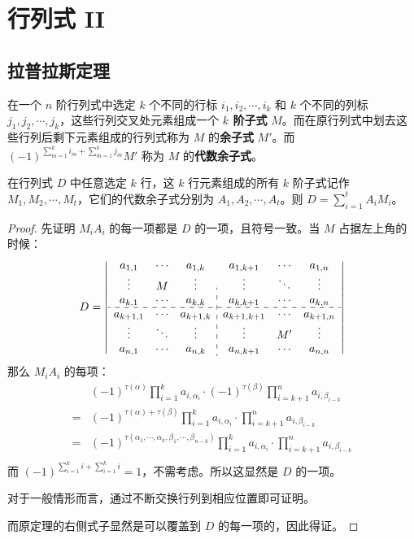 \section{行列式 II}

\subsection{拉普拉斯定理}

\begin{definition}
	在一个 $n$ 阶行列式中选定 $k$ 个不同的行标 $i_1,i_2,\cdots,i_k$ 和 $k$ 个不同的列标 $j_1,j_2,\cdots,j_k$，这些行列交叉处元素组成一个 \textbf{$k$ 阶子式} $M$。而在原行列式中划去这些行列后剩下元素组成的行列式称为 $M$ 的\textbf{余子式} $M'$。而 $(-1)^{\sum_{m=1}^k i_m + \sum_{m=1}^k j_m} M'$ 称为 $M$ 的\textbf{代数余子式}。
\end{definition}

\begin{theorem}[拉普拉斯定理]
	在行列式 $D$ 中任意选定 $k$ 行，这 $k$ 行元素组成的所有 $k$ 阶子式记作 $M_1,M_2,\cdots,M_t$，它们的代数余子式分别为 $A_1,A_2,\cdots,A_t$。则 $D = \sum_{i=1}^t A_i M_i$。

	\begin{proof}
		先证明 $M_i A_i$ 的每一项都是 $D$ 的一项，且符号一致。当 $M$ 占据左上角的时候：
		$$
		D = \left|\begin{array}{ccc:ccc}
			a_{1,1} & \cdots & a_{1,k} & a_{1,k+1} & \cdots & a_{1,n} \\
			\vdots & M & \vdots & \vdots & \ddots & \vdots \\
			a_{k,1} & \cdots & a_{k,k} & a_{k,k+1} & \cdots & a_{k,n} \\
			\hdashline
			a_{k+1,1} & \cdots & a_{k+1,k} & a_{k+1,k+1} & \cdots & a_{k+1,n} \\
			\vdots & \ddots & \vdots & \vdots & M' & \vdots \\
			a_{n,1} & \cdots & a_{n,k} & a_{n,k+1} & \cdots & a_{n,n}
		\end{array}\right|
		$$
		那么 $M_i A_i$ 的每项：
		$$
		\begin{aligned}
			& (-1)^{\tau(\alpha)} \prod_{i=1}^k a_{i,\alpha_i} \cdot (-1)^{\tau(\beta)} \prod_{i=k+1}^n a_{i,\beta_{i-k}} \\
			= & (-1)^{\tau(\alpha)+\tau(\beta)} \prod_{i=1}^k a_{i,\alpha_i} \cdot \prod_{i=k+1}^n a_{i,\beta_{i-k}} \\
			= & (-1)^{\tau(\alpha_1,\cdots,\alpha_k,\beta_1,\cdots,\beta_{n-k})} \prod_{i=1}^k a_{i,\alpha_i} \cdot  \prod_{i=k+1}^n a_{i,\beta_{i-k}} \\
		\end{aligned}
		$$
		而 $(-1)^{\sum_{i=1}^k i + \sum_{i=1}^k i}=1$，不需考虑。所以这显然是 $D$ 的一项。

		对于一般情形而言，通过不断交换行列到相应位置即可证明。

		而原定理的右侧式子显然是可以覆盖到 $D$ 的每一项的，因此得证。
	\end{proof}
\end{theorem}

